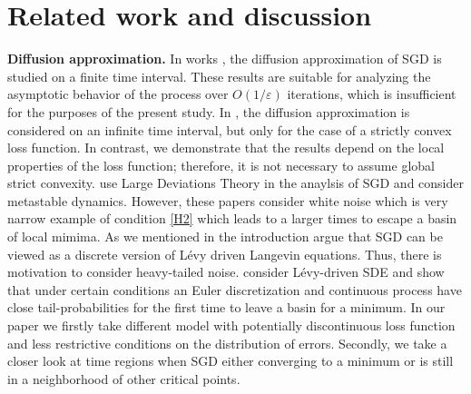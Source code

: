 \documentclass{article}
\makeatletter
\theoremstyle{plain}
\theoremstyle{definition}
\theoremstyle{remark}
\newcommand{\ra }{ \rightarrow} %
\def\namedlabel#1#2{\begingroup
    #2%
    \def\@currentlabel{#2}%
    \phantomsection\label{#1}\endgroup
}
\makeatother
\begin{document}



\section{Related work and discussion}\label{sec_lit_review}

\textbf{Diffusion approximation.} In works \cite{li2017, li2018}, the diffusion approximation of SGD is studied on a finite time interval. These results are suitable for analyzing the asymptotic behavior of the process over $O(1/\varepsilon)$ iterations, which is insufficient for the purposes of the present study. In \cite{li2022}, the diffusion approximation is considered on an infinite time interval, but only for the case of a strictly convex loss function. In contrast, we demonstrate that the results depend on the local properties of the loss function; therefore, it is not necessary to assume global strict convexity. 
\citet{hu2019quasi} use Large Deviations Theory in the anaylsis of SGD and \citet{baudel2023hill} consider metastable dynamics. However, these papers consider white noise which is very narrow example of condition \ref{H2} which leads to a larger times to escape a basin of local mimima.  As we mentioned in the introduction \citet{simsekli2019tail} argue that SGD can be viewed as a discrete version of L\'{e}vy driven Langevin equations. Thus, there is motivation to consider heavy-tailed noise. \citet{nguyen2019first} consider L\'{e}vy-driven SDE and show that under certain conditions an Euler discretization and continuous process have close tail-probabilities for the first time to leave a basin for a minimum. In our paper we firstly take different model with potentially discontinuous loss function and less restrictive conditions on the distribution of errors. Secondly, we take a closer look at time regions when SGD either converging to a minimum or is still in a neighborhood of other critical points.
\end{document}
